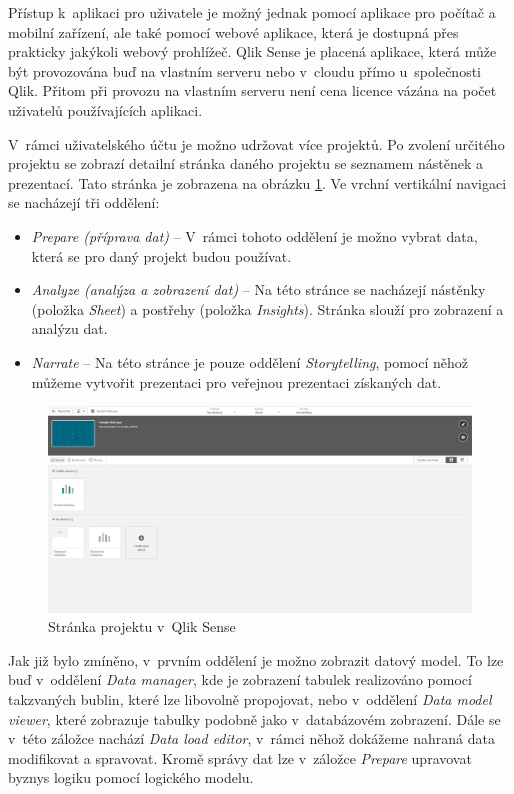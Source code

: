 \documentclass[czech,master]{diploma}
\begin{document}
Přístup k~aplikaci pro uživatele je možný jednak pomocí aplikace pro počítač a mobilní zařízení, ale také pomocí webové aplikace, která je dostupná přes prakticky jakýkoli webový prohlížeč. Qlik Sense je placená aplikace, která může být provozována buď na vlastním serveru nebo v~cloudu přímo u~společnosti Qlik. Přitom při provozu na vlastním serveru není cena licence vázána na počet uživatelů používajících aplikaci.

V~rámci uživatelského účtu je možno udržovat více projektů. Po zvolení určitého projektu se zobrazí detailní stránka daného projektu se seznamem nástěnek a prezentací. Tato stránka je zobrazena na obrázku \ref{fig:qlik_project}.  Ve vrchní vertikální navigaci se nacházejí tři oddělení:

\begin{itemize}
\item \textit{Prepare (příprava dat)} -- V~rámci tohoto oddělení je možno vybrat data, která se pro daný projekt budou používat.
\item \textit{Analyze (analýza a zobrazení dat)} -- Na této stránce se nacházejí nástěnky (položka \textit{Sheet}) a postřehy (položka \textit{Insights}). Stránka slouží pro zobrazení a analýzu dat.
\item \textit{Narrate} -- Na této stránce je pouze oddělení \textit{Storytelling}, pomocí něhož můžeme vytvořit prezentaci pro veřejnou prezentaci získaných dat.
\end{itemize}


\begin{figure}[!ht]
    \centering
    \includegraphics[width=1\textwidth]{Diplomka/Figures/qlik_project.png}
    \caption{Stránka projektu v~Qlik Sense}
    \label{fig:qlik_project}
\end{figure}


Jak již bylo zmíněno, v~prvním oddělení je možno zobrazit datový model. To lze buď v~oddělení \textit{Data manager}, kde je zobrazení tabulek realizováno pomocí takzvaných bublin, které lze libovolně propojovat, nebo v~oddělení \textit{Data model viewer}, které zobrazuje tabulky podobně jako v~databázovém zobrazení. Dále se v~této záložce nachází \textit{Data load editor}, v~rámci něhož dokážeme nahraná data modifikovat a spravovat. Kromě správy dat lze v~záložce \textit{Prepare} upravovat byznys logiku pomocí logického modelu.
\end{document}
